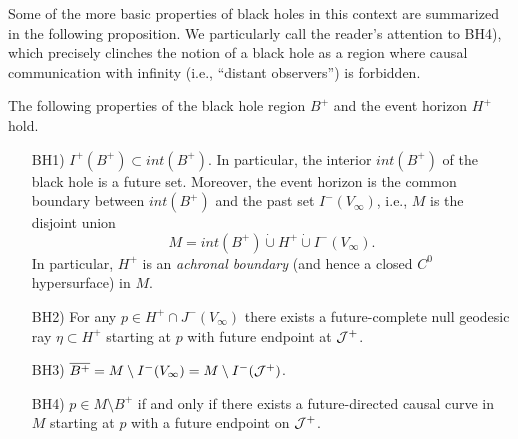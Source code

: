 Some of the more basic properties of black holes in this context are summarized in the following proposition. We particularly call the reader's attention to BH4), which precisely clinches the notion of a black hole as a region where causal communication with infinity (i.e., ``distant observers'') is forbidden.
\begin{proposition}
\label{bhprops}
The following properties of the black hole region $B^+$ and the event horizon $H^+$ hold.
\begin{itemize}
\item[BH1)] $I^+(B^+) \subset int(B^+)$. In particular, the interior $int(B^+)$ of the black hole is a future set. Moreover, the event horizon is the common boundary between $int(B^+)$ and the past set $I^-(V_{\infty})$, i.e., $M$ is the disjoint union
\begin{equation}
\label{equality}
M = int(B^+) \dot{\cup} H^+ \dot{\cup}I^-(V_{\infty}).
\end{equation}
In particular, $H^+$ is an {\em achronal boundary} (and hence \cite{ONeillSemiRiemannianGeometryApplications1983,PenroseDifferentialTopology1972} a closed $C^0$ hypersurface) in $M$.
\item[BH2)] For any  $p \in H^+\cap J^-(V_{\infty})$ there exists a future-complete null geodesic ray $\eta \subset H^+$ starting at $p$ with future endpoint at ${\cal J}^+$.
\item[BH3)] $\overline{B^+} = M \setminus I^-(V_{\infty}) = M \setminus I^-({\cal J}^+)$.
\item[BH4)] $p \in M \setminus B^+$ if and only if there exists a future-directed causal curve in $M$ starting at $p$ with a future endpoint on ${\cal J}^+$.
\end{itemize}
\end{proposition}
